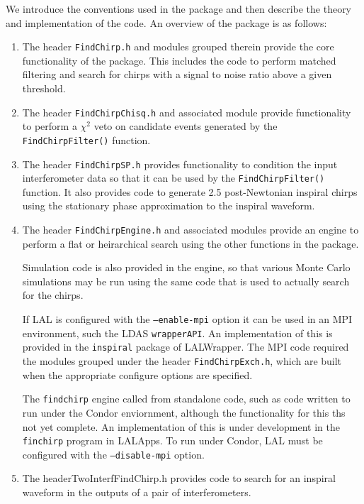 We introduce the conventions used in the package and then describe the theory
and implementation of the code. An overview of the package is as follows:
\begin{enumerate}
\item The header \texttt{FindChirp.h} and modules grouped therein provide the
core functionality of the package. This includes the code to perform matched
filtering and search for chirps with a signal to noise ratio above a given
threshold.

\item The header \texttt{FindChirpChisq.h} and associated module provide
functionality to perform a $\chi^2$ veto on candidate events generated by the
\texttt{FindChirpFilter()} function.

\item The header \texttt{FindChirpSP.h} provides functionality to condition
the input interferometer data so that it can be used by the 
\texttt{FindChirpFilter()} function. It also provides code to generate 2.5
post-Newtonian inspiral chirps using the stationary phase approximation to the
inspiral waveform.

\item The header \texttt{FindChirpEngine.h} and associated modules provide an
engine to perform a flat or heirarchical search using the other functions in
the package. 

Simulation code is also provided in the engine, so that various Monte Carlo
simulations may be run using the same code that is used to actually search for
the chirps.

If LAL is configured with the \texttt{--enable-mpi} option it can
be used in an MPI environment, such the LDAS \texttt{wrapperAPI}. An
implementation of this is provided in the \texttt{inspiral} package of
LALWrapper. The MPI code required the modules grouped under the header
\texttt{FindChirpExch.h}, which are built when the appropriate configure
options are specified.

The \texttt{findchirp} engine called from standalone code, such as code
written to run under the Condor enviornment, although the functionality for
this ths not yet complete. An implementation of this is under development in
the \texttt{finchirp} program in LALApps. To run under Condor, LAL must be
configured with the \texttt{--disable-mpi} option.

\item The header{TwoInterfFindChirp.h} provides code to search for an inspiral
waveform in the outputs of a pair of interferometers.
\end{enumerate}

